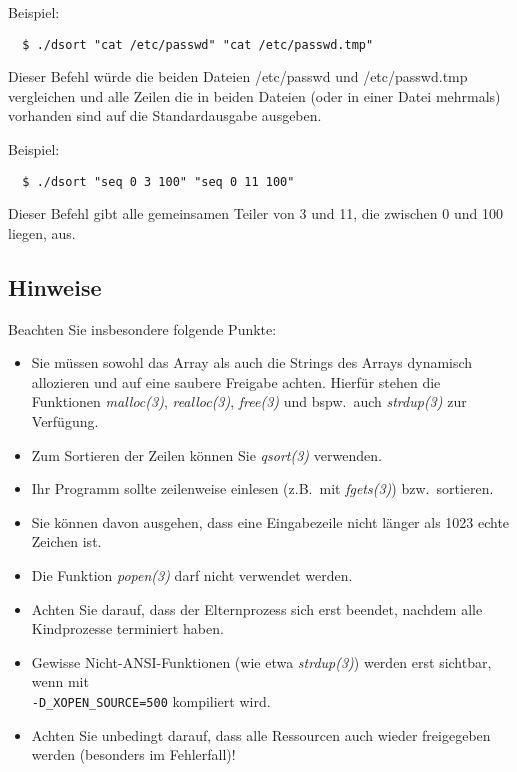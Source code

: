 Beispiel:
\begin{verbatim}
  $ ./dsort "cat /etc/passwd" "cat /etc/passwd.tmp"
\end{verbatim}

Dieser Befehl würde die beiden Dateien /etc/passwd und /etc/passwd.tmp
vergleichen und alle Zeilen die in beiden Dateien (oder in einer Datei
mehrmals) vorhanden sind auf die Standardausgabe ausgeben.

Beispiel:
\begin{verbatim}
  $ ./dsort "seq 0 3 100" "seq 0 11 100"
\end{verbatim}

Dieser Befehl gibt alle gemeinsamen Teiler von 3 und 11, die zwischen
0 und 100 liegen, aus.

\subsection*{Hinweise}

Beachten Sie insbesondere folgende Punkte:

\begin{itemize}
\item Sie müssen sowohl das Array als auch die Strings des Arrays
dynamisch allozieren und auf eine saubere Freigabe achten. Hierfür
stehen die Funktionen \emph{malloc(3)}, \emph{realloc(3)},
\emph{free(3)} und bspw.\ auch \emph{strdup(3)} zur Verfügung.
\item Zum Sortieren der Zeilen können Sie \emph{qsort(3)} verwenden.
\item Ihr Programm sollte zeilenweise einlesen (z.B.\ mit
\emph{fgets(3)}) bzw.\ sortieren.
\item Sie können davon ausgehen, dass eine Eingabezeile nicht länger
als 1023 echte Zeichen ist.
\item Die Funktion \emph{popen(3)} darf nicht verwendet werden.
\item Achten Sie darauf, dass der Elternprozess sich erst beendet,
nachdem alle Kindprozesse terminiert haben.
\item Gewisse Nicht-ANSI-Funktionen (wie etwa \emph{strdup(3)}) werden
erst sichtbar, wenn mit\\
\verb,-D_XOPEN_SOURCE=500, kompiliert wird.
\item Achten Sie unbedingt darauf, dass alle Ressourcen auch wieder
freigegeben werden (besonders im Fehlerfall)!
\end{itemize}

\osueguidelinestwo


